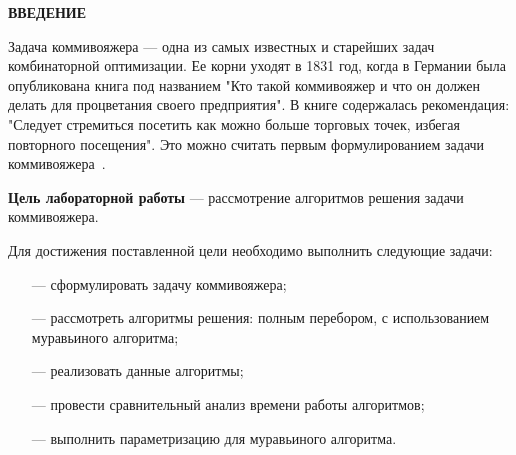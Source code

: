 \begin{center}
    \textbf{ВВЕДЕНИЕ}
\end{center}

Задача коммивояжера --- одна из самых известных и старейших задач комбинаторной оптимизации. Ее корни уходят в 1831 год, когда в Германии была опубликована книга под названием "Кто такой коммивояжер и что он должен делать для процветания своего предприятия". В книге содержалась рекомендация: "Следует стремиться посетить как можно больше торговых точек, избегая повторного посещения". Это можно считать первым формулированием задачи коммивояжера~\cite{com_info}.

\textbf{Цель лабораторной работы} --- рассмотрение алгоритмов решения задачи коммивояжера.

Для достижения поставленной цели необходимо выполнить следующие задачи:
\begin{itemize}
    \item[---] сформулировать задачу коммивояжера;
    \item[---] рассмотреть алгоритмы решения: полным перебором, с использованием муравьиного алгоритма;
    \item[---] реализовать данные алгоритмы;
    \item[---] провести сравнительный анализ времени работы алгоритмов;
    \item[---] выполнить параметризацию для муравьиного алгоритма.
\end{itemize}